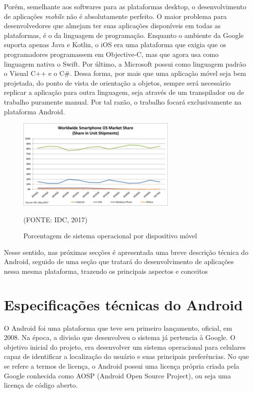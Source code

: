\documentclass[
    12pt,       %
    openright,      %
    twoside,      %
    a4paper,      %
    english,      %
    french,       %
    spanish,      %
    brazil,       %
    ]{abntex2}
\begin{document}
      Porém, semelhante aos softwares para as plataformas desktop, o desenvolvimento de aplicações
      \textit{mobile} não é absolutamente perfeito. O maior problema para desenvolvedores que almejam
      ter suas aplicações disponíveis em todas as plataformas, é o da linguagem de programação.
      Enquanto o ambiente da Google suporta apenas Java e Kotlin, o iOS era uma plataforma
      que exigia que os programadores programassem em Objective-C, mas que agora usa como linguagem
      nativa o Swift. Por último, a Microsoft possui como linguagem padrão o Visual C++ e o C\#.
      Dessa forma, por mais que uma aplicação móvel seja bem projetada, do ponto de vista de
      orientação a objetos, sempre será necessário replicar a aplicação para outra linguagem,
      seja através de um transpilador ou de trabalho puramente manual. Por tal razão, o
      trabalho focará exclusivamente na plataforma Android.

      \begin{figure}[htbp]
            \begin{center}
                \includegraphics[width=0.7\textwidth]{img/osPercentage.jpg}
            \end{center}
        \caption{\label{fig:passaro}Porcentagem de sistema operacional por dispositivo móvel}
        \begin{center}(FONTE: IDC, 2017)\end{center}
      \end{figure}

      Nesse sentido, nas próximas secções é apresentada uma breve descrição técnica do
      Android, seguido de uma seção que tratará do desenvolvimento de aplicações nessa
      mesma plataforma, trazendo os principais aspectos e conceitos

      \section{Especificações técnicas do Android}
        O Android foi uma plataforma que teve seu primeiro lançamento, oficial, em 2008. Na época,
        a divisão que desenvolveu o sistema já pertencia à Google. O objetivo inicial do projeto,
        era desenvolver um sistema operacional para celulares capaz de identificar a localização
        do usuário e suas principais preferências. No que se refere a termos de licença, o Android
        possui uma licença própria criada pela Google conhecida como AOSP (Android Open Source
        Project), ou seja uma licença de código aberto.
\end{document}
